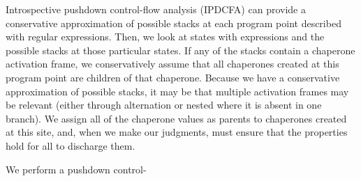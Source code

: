 \documentclass{sigplanconf}
\begin{document}
Introspective pushdown control-flow analysis (IPDCFA) can provide a conservative approximation of possible stacks at each program point described with regular expressions. Then, we look at states with expressions  and the possible stacks at those particular states. If any of the stacks contain a chaperone activation frame, we conservatively assume that all chaperones created at this program point are children of that chaperone. Because we have a conservative approximation of possible stacks, it may be that multiple activation frames may be relevant (either through alternation or nested where it is absent in one branch). We assign all of the chaperone values as parents to chaperones created at this site, and, when we make our judgments, must ensure that the properties hold for all to discharge them.

We perform a pushdown control-








\end{document}

